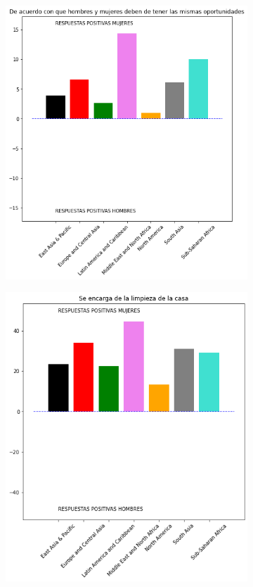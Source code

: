 \documentclass[12pt]{article}
\begin{document}
\begin{figure}
     \centering
     \begin{subfigure}[b]{0.45\textwidth}
         \centering
         \includegraphics[width=\textwidth]{images/221.png}
         \caption{}
         \label{fig:221}
     \end{subfigure}
     \hfill
     \begin{subfigure}[b]{0.45\textwidth}
         \centering
         \includegraphics[width=\textwidth]{images/222.png}

\end{subfigure}
\end{figure}
\end{document}
